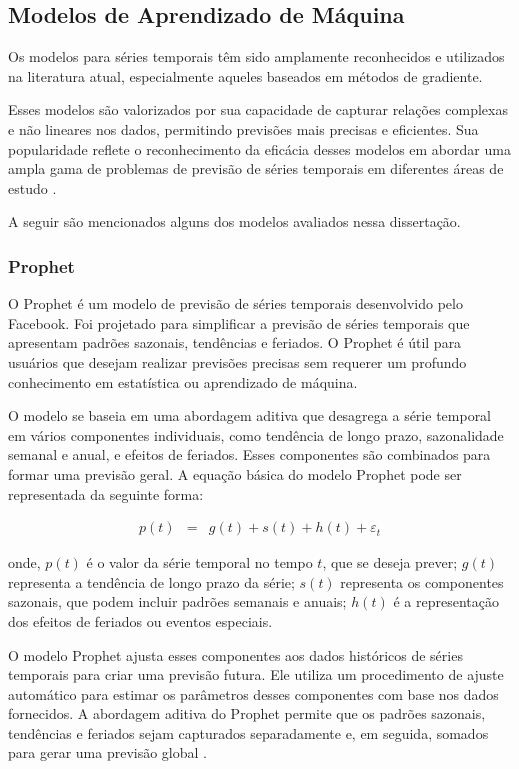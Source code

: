 \subsection{Modelos de Aprendizado de M\'aquina}\label{subsec:reg}

Os modelos para séries temporais têm sido amplamente reconhecidos e utilizados na literatura atual, especialmente aqueles baseados em métodos de gradiente. 

Esses modelos são valorizados por sua capacidade de capturar relações complexas e não lineares nos dados, permitindo previsões mais precisas e eficientes. Sua popularidade reflete o reconhecimento da eficácia desses modelos em abordar uma ampla gama de problemas de previsão de séries temporais em diferentes áreas de estudo \cite{al2021machine, sen2022machine, kheiri2023sentimentgpt}.

A seguir são mencionados alguns dos modelos avaliados nessa dissertação.


\subsubsection{Prophet}


O Prophet é um modelo de previsão de séries temporais desenvolvido pelo Facebook. Foi projetado para simplificar a previsão de séries temporais que apresentam padrões sazonais, tendências e feriados. O Prophet é útil para usuários que desejam realizar previsões precisas sem requerer um profundo conhecimento em estatística ou aprendizado de máquina.

O modelo se baseia em uma abordagem aditiva que desagrega a série temporal em vários componentes individuais, como tendência de longo prazo, sazonalidade semanal e anual, e efeitos de feriados. Esses componentes são combinados para formar uma previsão geral.
A equação básica do modelo Prophet pode ser representada da seguinte forma:

\begin{eqnarray}
	 p(t) &=& g(t) + s(t) + h(t) + \varepsilon_t 
\end{eqnarray}

\noindent onde, \( p(t) \) é o valor da série temporal no tempo \( t \), que se deseja prever; \( g(t) \) representa a tendência de longo prazo da série; \( s(t) \) representa os componentes sazonais, que podem incluir padrões semanais e anuais; \( h(t) \) é a representação dos efeitos de feriados ou eventos especiais.


O modelo Prophet ajusta esses componentes aos dados históricos de séries temporais para criar uma previsão futura. Ele utiliza um procedimento de ajuste automático para estimar os parâmetros desses componentes com base nos dados fornecidos. A abordagem aditiva do Prophet permite que os padrões sazonais, tendências e feriados sejam capturados separadamente e, em seguida, somados para gerar uma previsão global \cite{2-s2.0-85092514286}.

